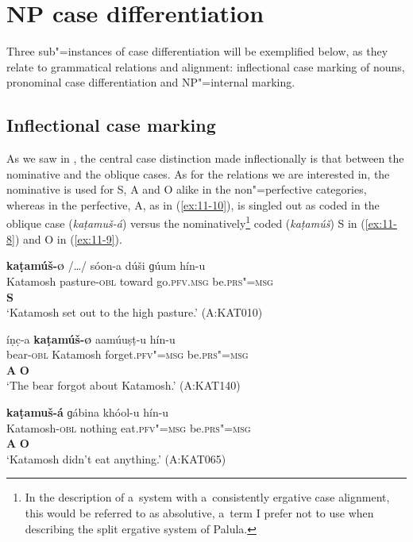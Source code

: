 \section{NP case differentiation}
\label{sec:11-2}

Three sub"=instances of case differentiation will be exemplified below, as they relate to grammatical relations and alignment: inflectional case marking of nouns, pronominal case differentiation and NP"=internal marking.


\subsection{Inflectional case marking}
\label{subsec:11-2-1}


As we saw in , the central case distinction made inflectionally is that between the nominative and the oblique cases. As for the relations we are interested in, the nominative is used for S, A and O alike in the non"=perfective categories, whereas in the perfective, A, as in (\ref{ex:11-10}), is singled out as coded in the oblique case (\textit{kaṭamuš-á}) versus the nominatively\footnote{In the description of a~system with a~consistently ergative case alignment, this would be referred to as absolutive, a~term I prefer not to use when describing the split ergative system of Palula.} coded (\textit{kaṭamúš}) S in (\ref{ex:11-8}) and O in (\ref{ex:11-9}).

\begin{exe}
\ex
\label{ex:11-8}
\glll \textbf{kaṭamúš-\textsc{ø}} /{\ldots}/ sóon-a dúši ɡúum  hín-u \\
Katamosh {} pasture-\textsc{obl} toward go.\textsc{pfv.msg}  be.\textsc{prs"=msg} \\
\textbf{S} \\
\glt `Katamosh set out to the high pasture.' (A:KAT010)

\ex
\label{ex:11-9}
\glll íṇc̣-a \textbf{kaṭamúš-\textsc{ø}} aamúuṣṭ-u hín-u \\
bear-\textsc{obl} Katamosh forget.\textsc{pfv"=msg} be.\textsc{prs"=msg} \\
 \textbf{A} \textbf{O} \\
\glt `The bear forgot about Katamosh.' (A:KAT140)

\ex
\label{ex:11-10}
\glll \textbf{kaṭamuš-á} ɡábina khóol-u hín-u \\
Katamosh-\textsc{obl} nothing eat.\textsc{pfv"=msg} be.\textsc{prs"=msg} \\
 \textbf{A} \textbf{O} \\
\glt `Katamosh didn't eat anything.' (A:KAT065)
\end{exe}

